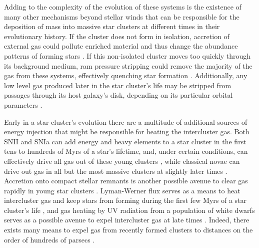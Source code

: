 \documentclass[fleqn,usenatbib]{mnras}
\begin{document}
 Adding to the complexity of the evolution of these systems is the existence of many other mechanisms beyond stellar winds that can be responsible for the deposition of mass into massive star clusters at different times in their evolutionary history.
 If the cluster does not form in isolation, accretion of external gas could pollute enriched material and thus change the abundance patterns of forming stars \citep{pflamm2009,dercole2010,naiman2011,conroy2012}.
 If this non-isolated cluster moves too quickly through its background medium, ram pressure stripping could remove the majority of the gas from these systems, effectively quenching star formation \citep{naiman2009,priestley2011}.
 Additionally, any low level gas produced later in the star cluster's life may be stripped from passages through its host galaxy's disk, depending on its particular orbital parameters \citep{desilva2009,martell2009,pancino2010a}.

 Early in a star cluster's evolution there are a multitude of additional sources of energy injection that might be responsible for heating the intercluster gas.
 Both SNII and SNIa can add energy and heavy elements to a star cluster in the first tens to hundreds of Myrs of a star's lifetime, and, under certain conditions, can effectively drive all gas out of these young clusters \citep{krause2013}, while classical novae can drive out gas in all but the most massive clusters at slightly later times \citep{moore2011}.
 Accretion onto compact stellar remnants is another possible avenue to clear gas rapidly in young star clusters \citep{leigh2013a}.
 Lyman-Werner flux serves as a means to heat intercluster gas and keep stars from forming during the first few Myrs of a star cluster's life \citep{conroy2011b,conroy2012,krause2013}, and gas heating by UV radiation from a population of white dwarfs serves as a possible avenue to expel intercluster gas at late times \citep{mcdonald2015}.
 Indeed, there exists many means to expel gas from recently formed clusters to distances on the order of hundreds of parsecs \citep{bastian2014b,hollyhead2015}.  
\end{document}
